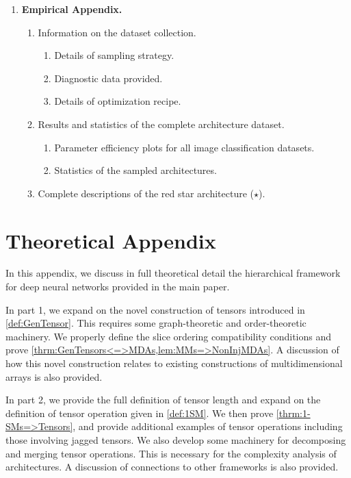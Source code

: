 \documentclass{article}
\theoremstyle{plain}
\theoremstyle{definition}
\theoremstyle{remark}
\begin{document}
\begin{enumerate}
	\item [B] \textbf{Empirical Appendix.}
	\begin{enumerate}
		\item [\textbf{\ref{sec:DataCollection}}] Information on the dataset collection.
		\begin{enumerate}
			\item [\ref{sec:DataCollection_Sampling}] Details of sampling strategy.
			\item [\ref{sec:DataCollection_DiagData}] Diagnostic data provided.
			\item [\ref{sec:DataCollection_Optim}] Details of optimization recipe.
		\end{enumerate}
		\item [\textbf{\ref{sec:DataResults}}] Results and statistics of the complete architecture dataset.
		\begin{enumerate}
			\item [\ref{sec:DataResults_PA}] Parameter efficiency plots for all image classification datasets.
			\item [\ref{sec:DataResults_Stats}] Statistics of the sampled architectures.
		\end{enumerate}
		\item [\textbf{\ref{sec:RedStarArch}}] Complete descriptions of the red star architecture ({\color{red}$\bm{\star}$}).
	\end{enumerate}
\end{enumerate}

\clearpage
\section{\label{sec:TheoryAppendix}Theoretical Appendix}
In this appendix, we discuss in full theoretical detail the hierarchical framework for deep neural networks provided in the main paper. 

In part 1, we expand on the novel construction of tensors introduced in \cref{def:GenTensor}. This requires some graph-theoretic and order-theoretic machinery. We properly define the slice ordering compatibility conditions and prove \cref{thrm:GenTensors<=>MDAs,lem:MMs=>NonInjMDAs}. A discussion of how this novel construction relates to existing constructions of multidimensional arrays is also provided.

In part 2, we provide the full definition of tensor length and expand on the definition of tensor operation given in \cref{def:1SM}. We then prove \cref{thrm:1-SMs=>Tensors}, and provide additional examples of tensor operations including those involving jagged tensors. We also develop some machinery for decomposing and merging tensor operations. This is necessary for the complexity analysis of architectures. A discussion of connections to other frameworks is also provided.
\end{document}
